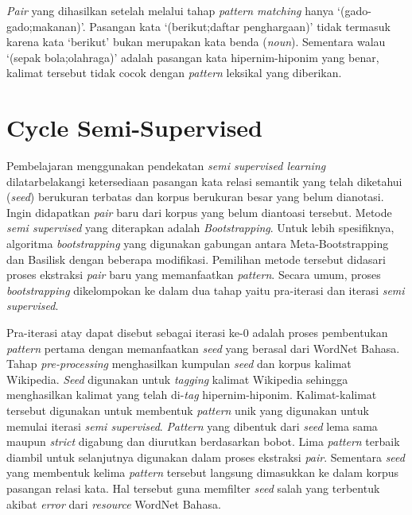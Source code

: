 \textit{Pair} yang dihasilkan setelah melalui tahap \textit{pattern matching} hanya `(gado-gado;makanan)'. Pasangan kata `(berikut;daftar penghargaan)' tidak termasuk karena kata `berikut' bukan merupakan kata benda (\textit{noun}). Sementara walau `(sepak bola;olahraga)' adalah pasangan kata hipernim-hiponim yang benar, kalimat tersebut tidak cocok dengan \textit{pattern} leksikal yang diberikan.


\section{Cycle Semi-Supervised}
Pembelajaran menggunakan pendekatan \textit{semi supervised learning} dilatarbelakangi ketersediaan pasangan kata relasi semantik yang telah diketahui (\textit{seed}) berukuran terbatas dan korpus berukuran besar yang belum dianotasi. Ingin didapatkan \textit{pair} baru dari korpus yang belum diantoasi tersebut. Metode \textit{semi supervised} yang diterapkan adalah \textit{Bootstrapping}. Untuk lebih spesifiknya, algoritma \textit{bootstrapping} yang digunakan gabungan antara Meta-Bootstrapping dan Basilisk dengan beberapa modifikasi. Pemilihan metode tersebut didasari proses ekstraksi \textit{pair} baru yang memanfaatkan \textit{pattern}. Secara umum, proses \textit{bootstrapping} dikelompokan ke dalam dua tahap yaitu pra-iterasi dan iterasi \textit{semi supervised}.

Pra-iterasi atay dapat disebut sebagai iterasi ke-0 adalah proses pembentukan \textit{pattern} pertama dengan memanfaatkan \textit{seed} yang berasal dari WordNet Bahasa. Tahap \textit{pre-processing} menghasilkan kumpulan \textit{seed} dan korpus kalimat Wikipedia. \textit{Seed} digunakan untuk \textit{tagging} kalimat Wikipedia sehingga menghasilkan kalimat yang telah di-\textit{tag} hipernim-hiponim. Kalimat-kalimat tersebut digunakan untuk membentuk \textit{pattern} unik yang digunakan untuk memulai iterasi \textit{semi supervised}. \textit{Pattern} yang dibentuk dari \textit{seed} lema sama maupun \textit{strict} digabung dan diurutkan berdasarkan bobot. Lima \textit{pattern} terbaik diambil untuk selanjutnya digunakan dalam proses ekstraksi \textit{pair}. Sementara \textit{seed} yang membentuk kelima \textit{pattern} tersebut langsung dimasukkan ke dalam korpus pasangan relasi kata. Hal tersebut guna memfilter \textit{seed} salah yang terbentuk akibat \textit{error} dari \textit{resource} WordNet Bahasa.

